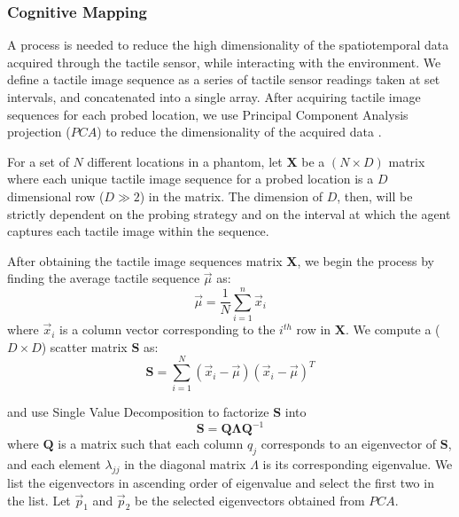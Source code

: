 \subsubsection{Cognitive Mapping}\label{sec_dim_reduction}

A process is needed to reduce the high dimensionality of the spatiotemporal data acquired through the 
tactile sensor, while interacting with the environment. We define a tactile image sequence as a series 
of tactile sensor readings taken at set intervals, and concatenated into a single array. After acquiring 
tactile image sequences for each probed location, we use Principal Component Analysis projection ($PCA$) 
\cite{tipping_probabilistic_1999} to reduce the dimensionality of the acquired data \cite{lloyd_least_1982}. 

For a set of $N$ different locations in a phantom, let $\mathbf{X}$ be a $(N\times D)$ matrix where each unique 
tactile image sequence for a probed location is a $D$ dimensional row ($D\gg2$) in the matrix. The dimension 
of $D$, then, will be strictly dependent on the probing strategy and on the interval at which the agent 
captures each tactile image within the sequence. 

After obtaining the tactile image sequences matrix $\mathbf{X}$, we begin the process by finding 
the average tactile sequence $\vec{\mu}$ as:
\begin{equation}
\vec{\mu} = \frac{1}{N}\sum_{i=1}^{n}\vec{x}_i
\end{equation}
where $\vec{x}_i$ is a column vector corresponding to the $i^{th}$ row in $\mathbf{X}$. We compute a 
($D\times D$) scatter matrix $\mathbf{S}$ as:
\begin{equation}
\mathbf{S} = \sum_{i=1}^{N}(\vec{x}_i-\vec{\mu})(\vec{x}_i-\vec{\mu})^T
\end{equation}

and use Single Value Decomposition to factorize $\mathbf{S}$ into
\begin{equation} \label{eq_SVD}
\mathbf{S} = \mathbf{Q}\mathbf{\Lambda} \mathbf{Q}^{-1}
\end{equation}
\noindent where $\mathbf{Q}$ is a matrix such that each column $q_j$ corresponds to an eigenvector 
of $\mathbf{S}$, and each element $\lambda_{jj}$ in the diagonal matrix $\Lambda$ is its corresponding 
eigenvalue. We list the eigenvectors in ascending order of eigenvalue and select the first two in the list. 
Let $\vec{p}_1$ and $\vec{p}_2$ be the selected eigenvectors obtained from $PCA$. 

